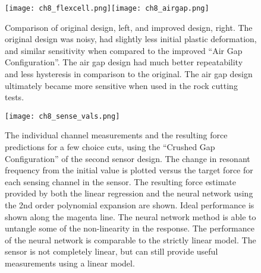 \begin{figure}[ht]
\centering
\texttt{[image: ch8\_flexcell.png]}\texttt{[image: ch8\_airgap.png]}
\caption{
Comparison of original design, left, and improved design, right.
The original design was noisy, had slightly less initial plastic deformation,
and similar sensitivity when compared to the improved ``Air Gap Configuration''.
The air gap design had much better repeatability and less hysteresis in comparison 
to the original.
The air gap design ultimately became more sensitive when used in the rock cutting tests.
}
\label{fig:xycompare}
\end{figure}



\begin{figure}[h]
\centering
\texttt{[image: ch8\_sense\_vals.png]}
\caption{
The individual channel measurements and the resulting force predictions for a few choice cuts,
using the ``Crushed Gap Configuration'' of the second sensor design.
The change in resonant frequency from the initial value is plotted versus the target force
for each sensing channel in the sensor. The resulting force estimate provided by both the 
linear regression and the neural network using the 2nd order polynomial expansion are shown.
Ideal performance is shown along the magenta line. 
The neural network method is able to untangle some of the non-linearity in the response.
The performance of the neural network is comparable to the strictly linear model.
The sensor is not completely linear, but can still provide useful measurements using a linear model.
}
\label{fig:sense_chans}
\end{figure}

